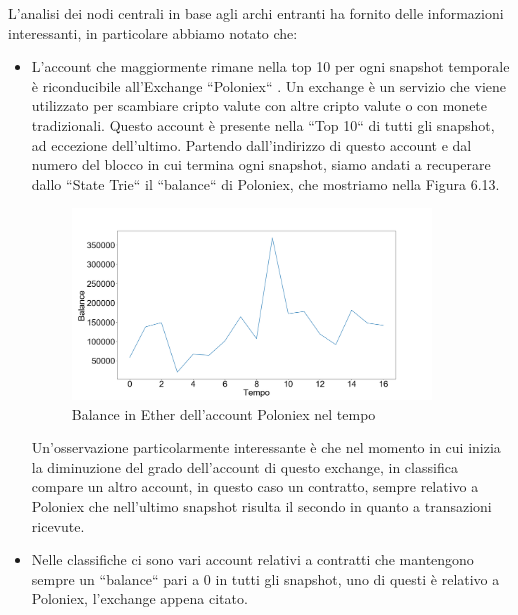 \documentclass[12pt]{report}
\begin{document}
L'analisi dei nodi centrali in base agli archi entranti ha fornito delle informazioni interessanti, in particolare abbiamo notato che:
\begin{itemize}
    \item L'account che maggiormente rimane nella top 10 per ogni snapshot temporale è riconducibile all'Exchange ``Poloniex`` \cite{Poloniex}.
    Un exchange è un servizio che viene utilizzato per scambiare cripto valute con altre cripto valute o con monete tradizionali.
    Questo account è presente nella ``Top 10`` di tutti gli snapshot, ad eccezione dell'ultimo.
    Partendo dall'indirizzo di questo account e dal numero del blocco in cui termina ogni snapshot, siamo andati a recuperare dallo ``State Trie`` il ``balance`` di Poloniex, che mostriamo nella Figura 6.13.
    \begin{figure}[H]
    \centering\includegraphics[width=0.9\textwidth]{Poloniex1.png}
    \caption{Balance in Ether dell'account Poloniex nel tempo}
    \end{figure}
    
    Un'osservazione particolarmente interessante è che nel momento in cui inizia la diminuzione del grado dell'account di questo exchange, in classifica compare un altro account, in questo caso un contratto, sempre relativo a Poloniex che nell'ultimo snapshot risulta il secondo in quanto a transazioni ricevute.
    
    \item Nelle classifiche ci sono vari account relativi a contratti che mantengono sempre un ``balance`` pari a 0 in tutti gli snapshot, uno di questi è relativo a Poloniex, l'exchange appena citato.
    

\end{itemize}
\end{document}
